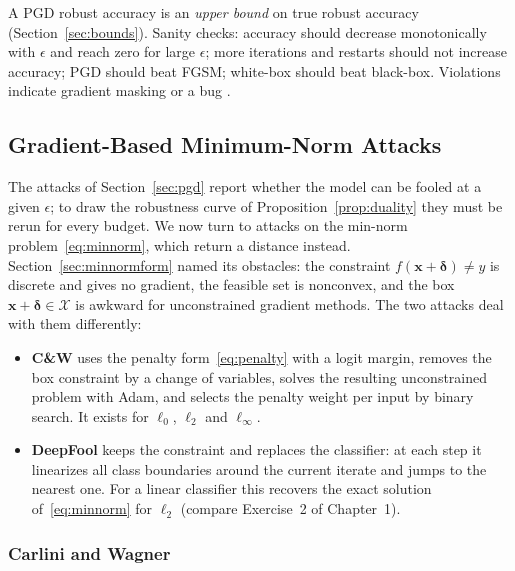 \documentclass[10pt,a4paper]{extarticle}
\theoremstyle{definition}
\newcommand{\X}{\mathcal{X}}
\newcommand{\x}{\mathbf{x}}
\newcommand{\bdelta}{\boldsymbol{\delta}}
\begin{document}
\begin{warnbox}
A PGD robust accuracy is an \emph{upper bound} on true robust accuracy (Section~\ref{sec:bounds}). Sanity checks: accuracy should decrease monotonically with \(\epsilon\) and reach zero for large \(\epsilon\); more iterations and restarts should not increase accuracy; PGD should beat FGSM; white-box should beat black-box. Violations indicate gradient masking or a bug \citep{carlini2019evaluating}.
\end{warnbox}

\subsection{Gradient-Based Minimum-Norm Attacks}\label{sec:minnorm}

The attacks of Section~\ref{sec:pgd} report whether the model can be fooled at a given \(\epsilon\); to draw the robustness curve of Proposition~\ref{prop:duality} they must be rerun for every budget. We now turn to attacks on the min-norm problem~\eqref{eq:minnorm}, which return a distance instead. Section~\ref{sec:minnormform} named its obstacles: the constraint \(f(\x+\bdelta)\neq y\) is discrete and gives no gradient, the feasible set is nonconvex, and the box \(\x+\bdelta\in\X\) is awkward for unconstrained gradient methods. The two attacks deal with them differently:
\begin{itemize}
  \item \textbf{C\&W} \citep{carlini2017towards} uses the penalty form~\eqref{eq:penalty} with a logit margin, removes the box constraint by a change of variables, solves the resulting unconstrained problem with Adam, and selects the penalty weight per input by binary search. It exists for \(\ell_0\), \(\ell_2\) and \(\ell_\infty\).
  \item \textbf{DeepFool} \citep{moosavi2016deepfool} keeps the constraint and replaces the classifier: at each step it linearizes all class boundaries around the current iterate and jumps to the nearest one. For a linear classifier this recovers the exact solution of~\eqref{eq:minnorm} for \(\ell_2\) (compare Exercise~2 of Chapter~1).
\end{itemize}

\subsubsection{Carlini and Wagner}\label{sec:cw}
\end{document}
